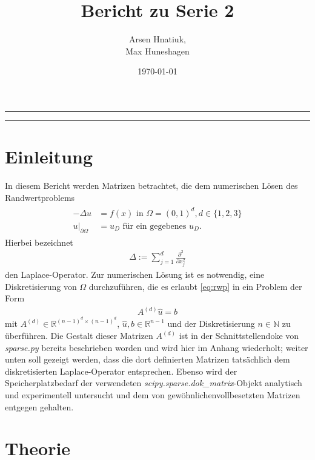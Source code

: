 \documentclass[smallheadings]{scrartcl}
\title{Bericht zu Serie 2}
\author{%
  Arsen Hnatiuk,\\%
  Max Huneshagen 
}
\date{\today}
\numberwithin{equation}{section}
\begin{document}
\maketitle
\tableofcontents
\bigskip

\hrule
\hrule


\section{Einleitung}

In diesem Bericht werden Matrizen betrachtet, die dem numerischen Lösen des Randwertproblems 
\begin{align}
\begin{split}
-\Delta u&=f(x)\text{ in }\Omega=(0, 1)^d, d\in\{1,2,3\}\\
u \vert _{\partial\Omega}&=u_D\text{ für ein gegebenes }u_D.
\end{split}
\label{eq:rwp}
\end{align}
Hierbei bezeichnet 
\begin{align}
\Delta :=\sum_{j=1}^{d}\frac{\partial^2}{\partial x_j^2}
\end{align}
den Laplace-Operator. Zur numerischen Lösung ist es notwendig, eine Diskretisierung von $\Omega$ durchzuführen, die es erlaubt \eqref{eq:rwp} in ein Problem der Form 
\begin{align}
A^{(d)}\hat{u}=b
\label{eq:lgs}
\end{align}
mit $A^{(d)}\in\mathbb{R}^{(n-1)^d\times(n-1)^d}$, $\hat{u},b\in\mathbb{R}^{n-1}$ und der Diskretisierung $n\in\mathbb{N}$ zu überführen.
Die Gestalt dieser Matrizen $A^{(d)}$ ist in der Schnittstellendoke von \textit{sparse.py} bereits beschrieben worden und wird hier im Anhang wiederholt; weiter unten soll gezeigt werden, dass die dort definierten Matrizen tatsächlich dem diskretisierten Laplace-Operator entsprechen. Ebenso wird der Speicherplatzbedarf der verwendeten \textit{scipy.sparse.dok\_matrix}-Objekt analytisch und experimentell untersucht und dem von \glqq gewöhnlichen\grqq vollbesetzten Matrizen entgegen gehalten.
\section{Theorie}
\end{document}
